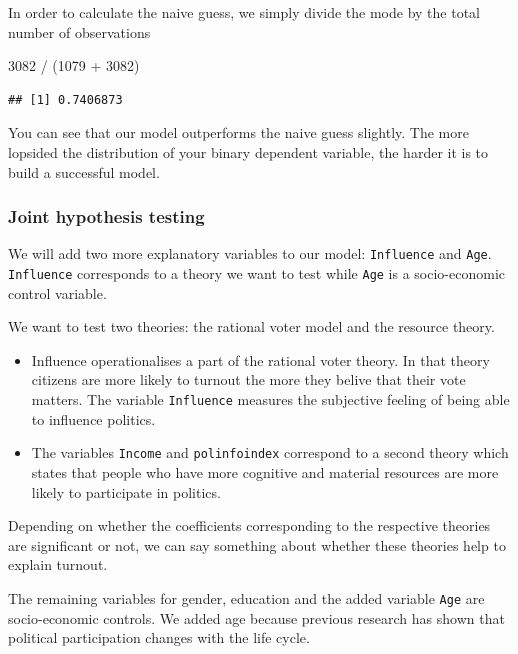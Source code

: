 \documentclass[]{article}
\newenvironment{Shaded}{\begin{snugshade}}{\end{snugshade}}
\newcommand{\DecValTok}[1]{\textcolor[rgb]{0.00,0.00,0.81}{{#1}}}
\newcommand{\StringTok}[1]{\textcolor[rgb]{0.31,0.60,0.02}{{#1}}}
\newcommand{\NormalTok}[1]{{#1}}
\theoremstyle{definition}
\theoremstyle{definition}
\theoremstyle{remark}
\begin{document}
In order to calculate the naive guess, we simply divide the mode by the
total number of observations

\begin{Shaded}
\begin{Highlighting}[]
\DecValTok{3082} \NormalTok{/}\StringTok{ }\NormalTok{(}\DecValTok{1079} \NormalTok{+}\StringTok{ }\DecValTok{3082}\NormalTok{)}
\end{Highlighting}
\end{Shaded}

\begin{verbatim}
## [1] 0.7406873
\end{verbatim}

You can see that our model outperforms the naive guess slightly. The
more lopsided the distribution of your binary dependent variable, the
harder it is to build a successful model.

\subsubsection{Joint hypothesis testing}\label{joint-hypothesis-testing}

We will add two more explanatory variables to our model:
\texttt{Influence} and \texttt{Age}. \texttt{Influence} corresponds to a
theory we want to test while \texttt{Age} is a socio-economic control
variable.

We want to test two theories: the rational voter model and the resource
theory.

\begin{itemize}
\item
  Influence operationalises a part of the rational voter theory. In that
  theory citizens are more likely to turnout the more they belive that
  their vote matters. The variable \texttt{Influence} measures the
  subjective feeling of being able to influence politics.
\item
  The variables \texttt{Income} and \texttt{polinfoindex} correspond to
  a second theory which states that people who have more cognitive and
  material resources are more likely to participate in politics.
\end{itemize}

Depending on whether the coefficients corresponding to the respective
theories are significant or not, we can say something about whether
these theories help to explain turnout.

The remaining variables for gender, education and the added variable
\texttt{Age} are socio-economic controls. We added age because previous
research has shown that political participation changes with the life
cycle.
\end{document}
